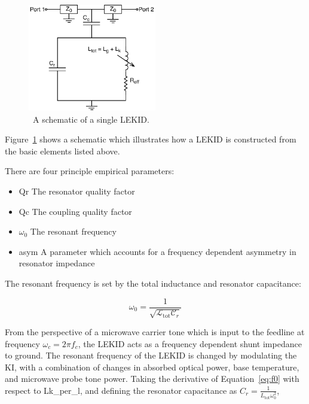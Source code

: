 \begin{figure}[!htbp]
\centering
\includegraphics[width=0.5\textwidth]{figures/kid_model/mkid_schematic}
\caption{~A schematic of a single LEKID.}
\label{fig:lekid_schematic}
\end{figure}

Figure~\ref{fig:lekid_schematic} shows a schematic which illustrates how a LEKID is constructed from the basic elements listed above.

There are four principle empirical parameters:

\begin{itemize}[label={},nosep]
  \item \gls{Qr} \quad The resonator quality factor
  \item \gls{Qc} \quad The coupling quality factor
  \item $\omega_{0}$ \quad The resonant frequency
  \item \gls{asym} \quad A parameter which accounts for a frequency dependent asymmetry in resonator impedance
\end{itemize}

The resonant frequency is set by the total inductance and resonator capacitance:

\begin{equation}\label{eq:f0}
  \omega_{0} = \frac{1}{\sqrt{\mathcal{L}_{\mathrm{tot}}\mathcal{C}_{r}}}
\end{equation}

From the perspective of a microwave carrier tone which is input to the feedline at frequency $\omega_{c} = 2\pi f_{c}$, the LEKID acts as a frequency dependent shunt impedance to ground. The resonant frequency of the LEKID is changed by modulating the KI, with a combination of changes in absorbed optical power, base temperature, and microwave probe tone power. Taking the derivative of Equation~\ref{eq:f0} with respect to \gls{Lk_per_l}, and defining the resonator capacitance as $C_{r} = \frac{1}{L_{\mathrm{tot}}\omega_{0}^{2}}$,

